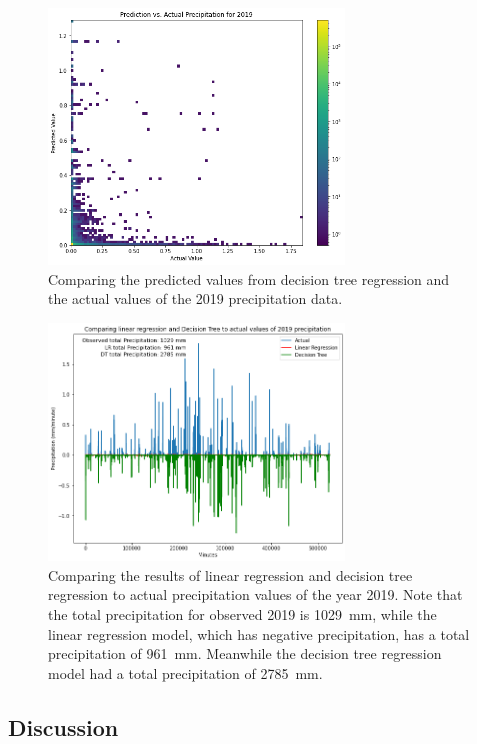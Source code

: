 \documentclass[11pt]{report}
\begin{document}
\begin{figure}[th!]
  \centering
  \includegraphics[width=0.7\textwidth]{Figures/predict_and_actual_2019_precip.png}
  \caption[Comparing ML predicted values to actual precipitation
    values]{Comparing the predicted values from decision tree
    regression and the actual values of the 2019 precipitation data.
  }
\end{figure}
\begin{figure}[bh!]
  \centering
  \includegraphics[width = 0.7\textwidth]{Figures/Comparison.png}
  \caption[Comparing ML results to actual precipitation values]{
    Comparing the results of linear regression and decision tree
    regression to actual precipitation values of the year 2019. Note
    that the total precipitation for observed 2019 is 1029~mm, while
    the linear regression model, which has negative precipitation, has
    a total precipitation of 961~mm. Meanwhile the decision tree
    regression model had a total precipitation of 2785~mm. }
\end{figure}

\subsection{Discussion}
\end{document}
